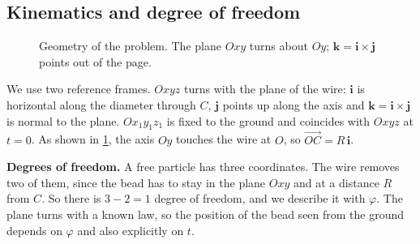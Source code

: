 \documentclass[11pt,a4paper]{article}
\newcommand{\er}{\bm{e}_r}
\newcommand{\ephi}{\bm{e}_\varphi}
\newcommand{\ii}{\bm{i}}
\newcommand{\jj}{\bm{j}}
\newcommand{\kk}{\bm{k}}
\begin{document}
\subsection{Kinematics and degree of freedom}
\begin{figure}[htbp]
\centering
{}
\caption{Geometry of the problem. The plane $Oxy$ turns about $Oy$; $\kk=\ii\times\jj$ points out of the page.}\label{fig:geom}
\end{figure}
We use two reference frames. $Oxyz$ turns with the plane of the wire: $\ii$ is horizontal along the diameter through $C$, $\jj$ points up along the axis and $\kk=\ii\times\jj$ is normal to the plane. $Ox_1y_1z_1$ is fixed to the ground and coincides with $Oxyz$ at $t=0$. As shown in \cref{fig:geom}, the axis $Oy$ touches the wire at $O$, so $\overrightarrow{OC}=R\,\ii$.

\textbf{Degrees of freedom.} A free particle has three coordinates. The wire removes two of them, since the bead has to stay in the plane $Oxy$ and at a distance $R$ from $C$. So there is $3-2=1$ degree of freedom, and we describe it with $\varphi$. The plane turns with a known law, so the position of the bead seen from the ground depends on $\varphi$ and also explicitly on $t$.
\end{document}
